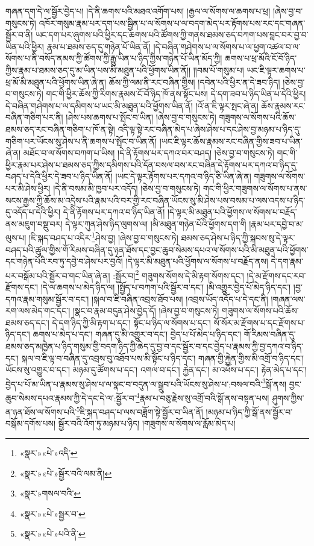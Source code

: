 གཞན་དག་དེ་ལ་སྦྱོར་བྱེད་པ། །དེ་ནི་ཆགས་པའི་མཐའ་འགོག་པས། །རྒྱལ་ལ་སོགས་ལ་ཆགས་པ་ཕྲ། །ཞེས་བྱ་བ་གསུངས་ཏེ། འཁོར་གསུམ་རྣམ་པར་དག་པས་སྦྱིན་པ་ལ་སོགས་པ་ལ་བདག་མེད་པར་རྟོགས་པས་རང་དང་གཞན་སྦྱོར་བ་ནི། ཡང་དག་པར་ཞུགས་པའི་ཕྱིར་དང་ཆགས་པའི་ཚོགས་ཀྱི་གནས་ཐམས་ཅད་བཀག་པས་བླང་བར་བྱ་བ་ཡིན་པའི་ཕྱིར། རྣམ་པ་ཐམས་ཅད་དུ་གཉེན་པོ་ཡིན་ནོ། །དེ་བཞིན་གཤེགས་པ་ལ་སོགས་པ་ལ་ཕྱག་འཚལ་བ་ལ་སོགས་པ་ནི་བསོད་ནམས་ཀྱི་ཚོགས་ཀྱི་རྒྱུ་ཡིན་པ་ཉིད་ཀྱིས་གཉེན་པོ་ཡིན་མོད་ཀྱི། ཆགས་པ་ཕྲ་མོའི་ངོ་བོ་ཉིད་ཀྱིས་རྣམ་པ་ཐམས་ཅད་དུ་མ་ཡིན་པས་མི་མཐུན་པའི་ཕྱོགས་ཡིན་ནོ།། །།བམ་པོ་གསུམ་པ། ཡང་ཇི་ལྟར་ཆགས་པ་ཕྲ་མོ་མི་མཐུན་པའི་ཕྱོགས་ཡིན་ཞེ་ན། ཆོས་ཀྱི་ལམ་ནི་རང་བཞིན་གྱིས། །དབེན་པའི་ཕྱིར་ན་དེ་ཟབ་ཉིད། །ཅེས་བྱ་བ་གསུངས་ཏེ། གང་གི་ཕྱིར་ཆོས་ཀྱི་རིགས་རྣམས་ངོ་བོ་ཉིད་ཁོ་ནས་སྟོང་པས། དེ་དག་ཟབ་པ་ཉིད་ཡིན་པ་དེའི་ཕྱིར། དེ་བཞིན་གཤེགས་པ་ལ་དམིགས་པ་ཡང་མི་མཐུན་པའི་ཕྱོགས་ཡིན་ནོ། །འོ་ན་ཇི་ལྟར་སྤང་ཞེ་ན། ཆོས་རྣམས་རང་བཞིན་གཅིག་པར་ནི། །ཤེས་པས་ཆགས་པ་སྤོང་བ་ཡིན། །ཞེས་བྱ་བ་གསུངས་ཏེ། གཟུགས་ལ་སོགས་པའི་ཆོས་ཐམས་ཅད་རང་བཞིན་གཅིག་པ་ཁོ་ན་སྟེ། འདི་ལྟ་སྟེ་རང་བཞིན་མེད་པ་ཞེས་ཤེས་པ་དང་ཤེས་བྱ་མཉམ་པ་ཉིད་དུ་གཅིག་པར་ཡོངས་སུ་ཤེས་པ་ནི་ཆགས་པ་སྤོང་བ་ཡིན་ནོ། །ཡང་ཇི་ལྟར་ཆོས་རྣམས་རང་བཞིན་གྱིས་ཟབ་པ་ཡིན་ཞེ་ན། མཐོང་བ་ལ་སོགས་བཀག་པ་ཡིས། །དེ་ནི་རྟོགས་པར་དཀའ་བར་བཤད། །ཅེས་བྱ་བ་གསུངས་ཏེ། གང་གི་ཕྱིར་རྣམ་པར་ཤེས་པ་ཐམས་ཅད་ཀྱིས་དམིགས་པའི་དོན་བསལ་བས་རང་བཞིན་དེ་རྟོགས་པར་དཀའ་བ་ཉིད་དུ་བཤད་པ་དེའི་ཕྱིར་དེ་ཟབ་པ་ཉིད་ཡིན་ནོ། །ཡང་དེ་ལྟར་རྟོགས་པར་དཀའ་བ་ཉིད་ཅི་ཡིན་ཞེ་ན། གཟུགས་ལ་སོགས་པར་མི་ཤེས་ཕྱིར། །དེ་ནི་བསམ་མི་ཁྱབ་པར་འདོད། །ཅེས་བྱ་བ་གསུངས་ཏེ། གང་གི་ཕྱིར་གཟུགས་ལ་སོགས་པ་ནས་སངས་རྒྱས་ཀྱི་ཆོས་མ་འདྲེས་པའི་རྣམ་པའི་བར་གྱི་རང་བཞིན་ཡོངས་སུ་མི་ཤེས་པས་བསམ་པ་ལས་འདས་པ་ཉིད་དུ་འདོད་པ་དེའི་ཕྱིར། དེ་ནི་རྟོགས་པར་དཀའ་བ་ཉིད་ཡིན་ནོ། །དེ་ལྟར་མི་མཐུན་པའི་ཕྱོགས་ལ་སོགས་པ་བརྗོད་ནས་མཇུག་བསྡུ་བར། དེ་ལྟར་ཀུན་ཤེས་ཉིད་ལུགས་ལ། །མི་མཐུན་གཉེན་པོའི་ཕྱོགས་དག་གི །རྣམ་པར་དབྱེ་བ་མ་ལུས་པ། །ཇི་སྐད་བཤད་པ་འདིར་\footnote{«སྣར་»«པེ་»འདི་}ཤེས་བྱ། །ཞེས་བྱ་བ་གསུངས་ཏེ། ཐམས་ཅད་ཤེས་པ་ཉིད་ཀྱི་སྐབས་སུ་དེ་ལྟར་བཤད་པའི་ཚུལ་གྱིས་གོ་རིམས་བཞིན་དུ་ཉན་ཐོས་དང་བྱང་ཆུབ་སེམས་དཔའ་ལ་སོགས་པའི་མི་མཐུན་པའི་ཕྱོགས་དང་གཉེན་པོའི་རབ་ཏུ་དབྱེ་བ་ཤེས་པར་བྱའོ། །དེ་ལྟར་མི་མཐུན་པའི་ཕྱོགས་ལ་སོགས་པ་བརྗོད་ནས། དེ་དག་རྣམ་པར་བསྒོམ་པའི་སྦྱོར་བ་གང་ཡིན་ཞེ་ན། :སྦྱོར་བ།\footnote{«སྣར་»«པེ་»སྦྱོར་བའི་ལམ་ནི།} གཟུགས་སོགས་དེ་མི་རྟག་སོགས་དང་། །དེ་མ་རྫོགས་དང་རབ་རྫོགས་དང་། །དེ་ལ་ཆགས་པ་མེད་ཉིད་ལ། །སྤྱོད་པ་བཀག་པའི་སྦྱོར་བ་དང་། །མི་འགྱུར་བྱེད་པོ་མེད་ཉིད་དང་། །བྱ་དཀའ་རྣམ་གསུམ་སྦྱོར་བ་དང་། །སྐལ་བ་ཇི་བཞིན་འབྲས་ཐོབ་པས། །འབྲས་ཡོད་འདོད་པ་དེ་དང་ནི། །གཞན་ལས་རག་ལས་མེད་གང་དང་། །སྣང་བ་རྣམ་བདུན་ཤེས་བྱེད་དོ། །ཞེས་བྱ་བ་གསུངས་ཏེ། གཟུགས་ལ་སོགས་པའི་ཆོས་ཐམས་ཅད་དང་། དེ་དག་ཉིད་ཀྱི་མི་རྟག་པ་དང་། སྟོང་པ་ཉིད་ལ་སོགས་པ་དང་། སོ་སོར་མ་རྫོགས་པ་དང་རྫོགས་པ་ཉིད་དང་། ཆགས་པ་མེད་པ་དང་། གཞན་དུ་མི་འགྱུར་བ་དང་། བྱེད་པ་པོ་མེད་པ་ཉིད་དང་། གོ་རིམས་བཞིན་དུ་ཐམས་ཅད་མཁྱེན་པ་ཉིད་གསུམ་གྱི་བདག་ཉིད་ཀྱི་ཆེད་དུ་བྱ་བ་དང་སྦྱོར་བ་དང་བྱེད་པ་རྣམས་ཀྱི་བྱ་དཀའ་བ་ཉིད་དང་། སྐལ་བ་ཇི་ལྟ་བ་བཞིན་དུ་འབྲས་བུ་འཐོབ་པས་མི་སྟོང་པ་ཉིད་དང་། གཞན་གྱི་རྐྱེན་གྱིས་མི་འགྲོ་བ་ཉིད་དང་། ཡོངས་སུ་འགྱུར་བ་དང་། མཉམ་དུ་ཚོགས་པ་དང་། འགལ་བ་དང་། རྐྱེན་དང་། མ་འཕོས་པ་དང་། རྟེན་མེད་པ་དང་། བྱེད་པ་པོ་མ་ཡིན་པ་རྣམས་སུ་ཤེས་པ་ལ་སྣང་བ་བདུན་ལ་སྒྲུབ་པའི་ཡོངས་སུ་ཤེས་པ་:བསལ་བའི་\footnote{«སྣར་»གསལ་བའི་}སྒོ་ནས། བྱང་ཆུབ་སེམས་དཔའ་རྣམས་ཀྱི་དེ་དང་དེ་ལ་:སྦྱོར་བ་\footnote{«སྣར་»«པེ་»སྦྱར་བ་}རྣམ་པ་བཅུ་རྗེས་སུ་འགྲོ་བའི་སྒོ་ནས་བསྟན་པས། ཤུགས་ཀྱིས་ན་ཉན་ཐོས་ལ་སོགས་པའི་\footnote{«སྣར་»«པེ་»པའི་ནི་}ཇི་སྐད་བཤད་པ་ལས་བཟློག་སྟེ་སྦྱོར་བ་ཡིན་ནོ། །མཉམ་པ་ཉིད་ཀྱི་སྒོ་ནས་སྦྱོར་བ་བསྒོམ་དགོས་པས། སྦྱོར་བའི་འོག་ཏུ་མཉམ་པ་ཉིད། །གཟུགས་ལ་སོགས་ལ་རློམ་མེད་པ། 